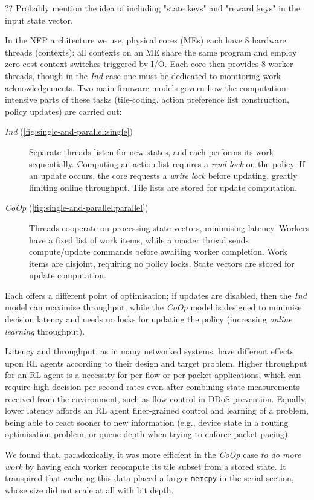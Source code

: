 \documentclass[sigconf,natbib=false]{acmart}
\newcommand{\Coopfw}{\emph{CoOp}}
\newcommand{\coopfw}{\Coopfw}
\newcommand{\Indfw}{\emph{Ind}}
\newcommand{\indfw}{\Indfw}
\begin{document}
?? Probably mention the idea of including "state keys" and "reward keys" in the input state vector.

In the NFP architecture we use, physical cores (MEs) each have 8 hardware threads (contexts): all contexts on an ME share the same program and employ zero-cost context switches triggered by I/O.
Each core then provides 8 worker threads, though in the \indfw{} case one must be dedicated to monitoring work acknowledgements.
Two main firmware models govern how the computation-intensive parts of these tasks (tile-coding, action preference list construction, policy updates) are carried out:
\begin{description}
	\item[\Indfw{} (\cref{fig:single-and-parallel:single})] Separate threads listen for new states, and each performs its work sequentially. Computing an action list requires a \emph{read lock} on the policy. If an update occurs, the core requests a \emph{write lock} before updating, greatly limiting online throughput. Tile lists are stored for update computation.
	\item[\Coopfw{} (\cref{fig:single-and-parallel:parallel})] Threads cooperate on processing state vectors, minimising latency. Workers have a fixed list of work items, while a master thread sends compute/update commands before awaiting worker completion. Work items are disjoint, requiring no policy locks. State vectors are stored for update computation.
\end{description}
Each offers a different point of optimisation; if updates are disabled, then the \emph{\indfw{}} model can maximise throughput, while the \emph{\coopfw{}} model is designed to minimise decision latency and needs no locks for updating the policy (increasing \emph{online learning} throughput).

Latency and throughput, as in many networked systems, have different effects upon RL agents according to their design and target problem.
Higher throughput for an RL agent is a necessity for per-flow or per-packet applications, which can require high decision-per-second rates even after combining state measurements received from the environment, such as flow control in DDoS prevention.
Equally, lower latency affords an RL agent finer-grained control and learning of a problem, being able to react sooner to new information (e.g., device state in a routing optimisation problem, or queue depth when trying to enforce packet pacing).

We found that, paradoxically, it was more efficient in the \Coopfw{} case \emph{to do more work} by having each worker recompute its tile subset from a stored state.
It transpired that cacheing this data placed a larger \texttt{memcpy} in the serial section, whose size did not scale at all with bit depth.
\end{document}

